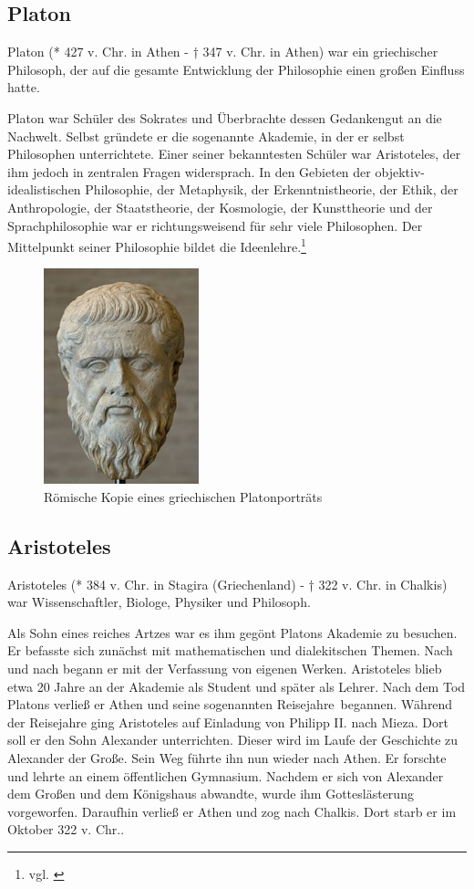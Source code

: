 \subsection{Platon}
Platon (* 427 v.  Chr. in Athen - † 347 v. Chr. in Athen) war ein griechischer Philosoph, der auf die gesamte Entwicklung der Philosophie einen großen Einfluss hatte. 

Platon war Schüler des Sokrates und Überbrachte dessen Gedankengut an die Nachwelt. Selbst gründete er die sogenannte Akademie, in der er selbst Philosophen unterrichtete. Einer seiner bekanntesten Schüler war Aristoteles, der ihm jedoch in zentralen Fragen widersprach.  In den Gebieten der objektiv-idealistischen Philosophie, der Metaphysik, der Erkenntnistheorie, der Ethik, der Anthropologie, der Staatstheorie, der Kosmologie, der Kunsttheorie und der Sprachphilosophie war er richtungsweisend für sehr viele Philosophen. Der Mittelpunkt seiner Philosophie bildet die Ideenlehre.\footnote{vgl. \cite{Platon1} \cite{Platon2}}

\begin{figure}[H]
	\centering 
	\includegraphics[width=0.4\textwidth]{Bilder/kap3/platon} 
	\caption{Römische Kopie eines griechischen Platonporträts\cite{WikiPL}  \label{portraitPlaton}}
\end{figure}

\subsection{Aristoteles}
Aristoteles (* 384 v. Chr. in Stagira (Griechenland) - † 322 v. Chr. in Chalkis) war Wissenschaftler, Biologe, Physiker und Philosoph. 

Als Sohn eines reiches Artzes war es ihm gegönt Platons Akademie zu besuchen. Er befasste sich zunächst mit mathematischen und dialekitschen Themen. Nach und nach begann er mit der Verfassung von eigenen Werken. Aristoteles blieb etwa 20 Jahre an der Akademie als Student und später als Lehrer. Nach dem Tod Platons verließ er Athen und seine sogenannten \glqq Reisejahre\grqq\ begannen. Während der Reisejahre ging Aristoteles auf Einladung von Philipp II. nach Mieza. Dort soll er den Sohn Alexander unterrichten. Dieser wird im Laufe der Geschichte zu Alexander der Große. Sein Weg führte ihn nun wieder nach Athen. Er forschte und lehrte an einem öffentlichen Gymnasium. Nachdem er sich von Alexander dem Großen und dem Königshaus abwandte, wurde ihm Gotteslästerung vorgeworfen. Daraufhin verließ er Athen und zog nach Chalkis. Dort starb er im Oktober 322 v. Chr.. 

